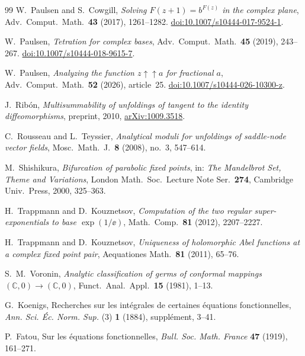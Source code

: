 \begin{thebibliography}{99}
W.~Paulsen and S.~Cowgill,
\emph{Solving $F(z+1)=b^{F(z)}$ in the complex plane},
Adv.\ Comput.\ Math.\ \textbf{43} (2017), 1261--1282.
\href{https://doi.org/10.1007/s10444-017-9524-1}{doi:10.1007/s10444-017-9524-1}.

W.~Paulsen,
\emph{Tetration for complex bases},
Adv.\ Comput.\ Math.\ \textbf{45} (2019), 243--267.
\href{https://doi.org/10.1007/s10444-018-9615-7}{doi:10.1007/s10444-018-9615-7}.

W.~Paulsen,
\emph{Analyzing the function $z\uparrow\uparrow a$ for fractional $a$},
Adv.\ Comput.\ Math.\ \textbf{52} (2026), article~25.
\href{https://doi.org/10.1007/s10444-026-10300-z}{doi:10.1007/s10444-026-10300-z}.

J.~Rib\'on,
\emph{Multisummability of unfoldings of tangent to the identity
diffeomorphisms}, preprint, 2010,
\href{https://arxiv.org/abs/1009.3518}{arXiv:1009.3518}.

C.~Rousseau and L.~Teyssier,
\emph{Analytical moduli for unfoldings of saddle-node vector fields},
Mosc.\ Math.\ J.\ \textbf{8} (2008), no.~3, 547--614.

M.~Shishikura,
\emph{Bifurcation of parabolic fixed points},
in: \emph{The Mandelbrot Set, Theme and Variations},
London Math.\ Soc.\ Lecture Note Ser.\ \textbf{274},
Cambridge Univ.\ Press, 2000, 325--363.

H.~Trappmann and D.~Kouznetsov,
\emph{Computation of the two regular super-exponentials to base
$\exp(1/\ee)$},
Math.\ Comp.\ \textbf{81} (2012), 2207--2227.

H.~Trappmann and D.~Kouznetsov,
\emph{Uniqueness of holomorphic Abel functions at a complex fixed point pair},
Aequationes Math.\ \textbf{81} (2011), 65--76.

S.~M.~Voronin,
\emph{Analytic classification of germs of conformal mappings
$(\mathbb C,0)\to(\mathbb C,0)$},
Funct.\ Anal.\ Appl.\ \textbf{15} (1981), 1--13.


G.~Koenigs, Recherches sur les int\'egrales de certaines \'equations fonctionnelles,
\emph{Ann. Sci. \'Ec. Norm. Sup.} (3) \textbf{1} (1884), suppl\'ement, 3--41.

P.~Fatou, Sur les \'equations fonctionnelles,
\emph{Bull. Soc. Math. France} \textbf{47} (1919), 161--271.


\end{thebibliography}
